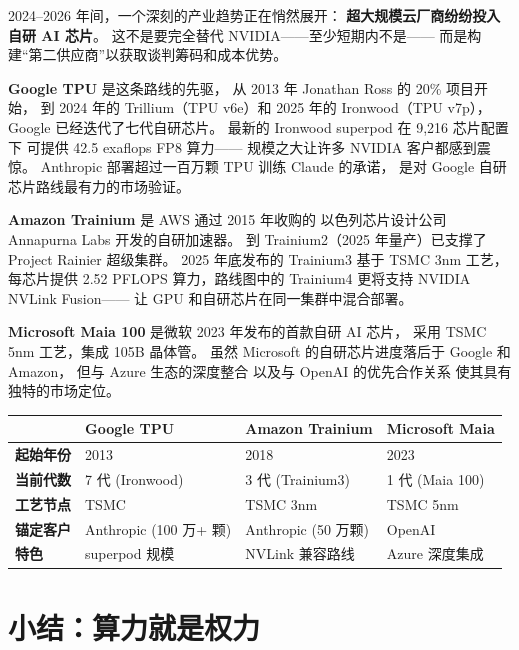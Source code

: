2024--2026 年间，一个深刻的产业趋势正在悄然展开：
\textbf{超大规模云厂商纷纷投入自研 AI 芯片}。
这不是要完全替代 NVIDIA——至少短期内不是——
而是构建``第二供应商''以获取谈判筹码和成本优势。

\textbf{Google TPU} 是这条路线的先驱，
从 2013 年 Jonathan Ross 的 20\% 项目开始，
到 2024 年的 Trillium（TPU v6e）和 2025 年的 Ironwood（TPU v7p），
Google 已经迭代了七代自研芯片。
最新的 Ironwood superpod 在 9,216 芯片配置下
可提供 42.5 exaflops FP8 算力——
规模之大让许多 NVIDIA 客户都感到震惊。
Anthropic 部署超过一百万颗 TPU 训练 Claude 的承诺，
是对 Google 自研芯片路线最有力的市场验证。

\textbf{Amazon Trainium} 是 AWS 通过 2015 年收购的
以色列芯片设计公司 Annapurna Labs 开发的自研加速器。
到 Trainium2（2025 年量产）已支撑了 Project Rainier 超级集群。
2025 年底发布的 Trainium3 基于 TSMC 3nm 工艺，
每芯片提供 2.52 PFLOPS 算力，路线图中的 Trainium4
更将支持 NVIDIA NVLink Fusion——
让 GPU 和自研芯片在同一集群中混合部署。

\textbf{Microsoft Maia 100} 是微软 2023 年发布的首款自研 AI 芯片，
采用 TSMC 5nm 工艺，集成 105B 晶体管。
虽然 Microsoft 的自研芯片进度落后于 Google 和 Amazon，
但与 Azure 生态的深度整合
以及与 OpenAI 的优先合作关系
使其具有独特的市场定位。

\begin{corebox}
\small
\begin{tabularx}{\textwidth}{l X X X}
\toprule
\rowcolor{figLightGray}
& \textbf{Google TPU} & \textbf{Amazon Trainium} & \textbf{Microsoft Maia} \\
\midrule
\textbf{起始年份} & 2013 & 2018 & 2023 \\
\textbf{当前代数} & 7 代 (Ironwood) & 3 代 (Trainium3) & 1 代 (Maia 100) \\
\textbf{工艺节点} & TSMC & TSMC 3nm & TSMC 5nm \\
\textbf{锚定客户} & Anthropic (100 万+ 颗) & Anthropic (50 万颗) & OpenAI \\
\textbf{特色} & superpod 规模 & NVLink 兼容路线 & Azure 深度集成 \\
\bottomrule
\end{tabularx}
\end{corebox}

\section{小结：算力就是权力}
\label{sec:infra-summary}

